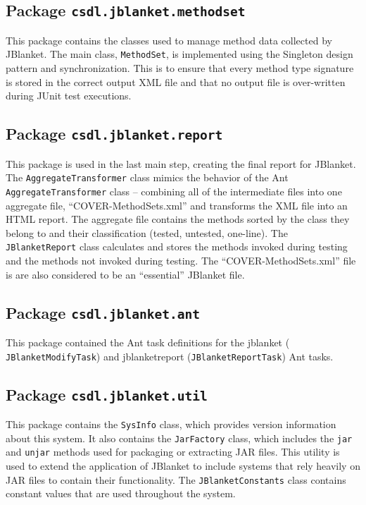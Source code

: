 \subsection{Package {\tt csdl.jblanket.methodset}}
This package contains the classes used to manage method data collected by
JBlanket.  The main class, {\tt MethodSet}, is implemented using the
Singleton design pattern and synchronization.  This is to ensure that every
method type signature is stored in the correct output XML file and that no
output file is over-written during JUnit test executions.

\subsection{Package {\tt csdl.jblanket.report}}
This package is used in the last main step, creating the final report for
JBlanket.  The {\tt AggregateTransformer} class mimics the behavior of the
Ant {\tt AggregateTransformer} class -- combining all of the intermediate
files into one aggregate file, ``COVER-MethodSets.xml'' and transforms the
XML file into an HTML report.  The aggregate file contains the methods
sorted by the class they belong to and their classification (tested,
untested, one-line).  The {\tt JBlanketReport} class calculates and stores
the methods invoked during testing and the methods not invoked during
testing.  The ``COVER-MethodSets.xml'' file is are also considered to be an
``essential'' JBlanket file.

\subsection{Package {\tt csdl.jblanket.ant}}
This package contained the Ant task definitions for the jblanket ({\tt
JBlanketModifyTask}) and jblanketreport ({\tt JBlanketReportTask}) Ant
tasks.

\subsection{Package {\tt csdl.jblanket.util}}
This package contains the {\tt SysInfo} class, which provides version
information about this system.  It also contains the {\tt JarFactory}
class, which includes the {\tt jar} and {\tt unjar} methods used for
packaging or extracting JAR files.  This utility is used to extend the
application of JBlanket to include systems that rely heavily on JAR files
to contain their functionality.  The {\tt JBlanketConstants} class contains
constant values that are used throughout the system.

